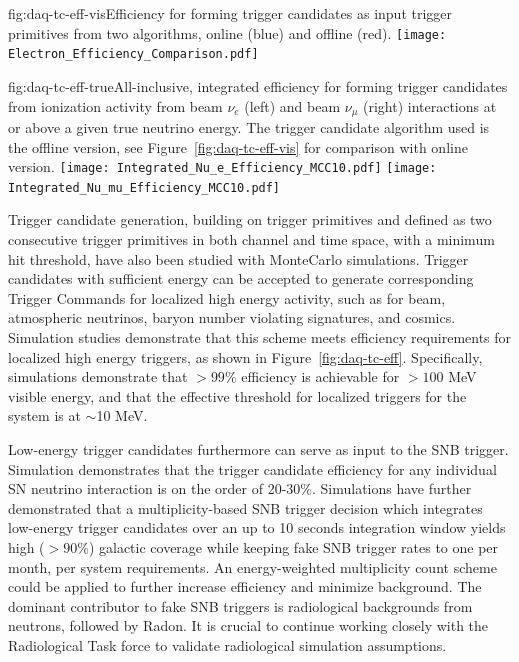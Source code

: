 \begin{dunefigure}{fig:daq-tc-eff-vis}{Efficiency for forming trigger candidates as input trigger primitives from two algorithms, online (blue) and offline (red).}
  \texttt{[image: Electron\_Efficiency\_Comparison.pdf]}
\end{dunefigure}

\begin{dunefigure}{fig:daq-tc-eff-true}{All-inclusive, integrated efficiency for forming trigger candidates from ionization activity from beam $\nu_e$ (left) and beam $\nu_\mu$ (right) interactions at or above a given true neutrino energy.  The trigger candidate algorithm used is the offline version, see Figure~\ref{fig:daq-tc-eff-vis} for comparison with online version.}
  \texttt{[image: Integrated\_Nu\_e\_Efficiency\_MCC10.pdf]}%
  \texttt{[image: Integrated\_Nu\_mu\_Efficiency\_MCC10.pdf]}
\end{dunefigure}


Trigger candidate generation, building on trigger primitives and defined
as two consecutive trigger primitives in both channel and time space,
with a minimum hit threshold, have also been studied with MonteCarlo
simulations. Trigger candidates with sufficient energy can be accepted
to generate corresponding Trigger Commands for localized high energy
activity, such as for beam, atmospheric neutrinos, baryon number
violating signatures, and cosmics. Simulation studies demonstrate that
this scheme meets efficiency requirements for localized high energy
triggers, as shown in Figure~\ref{fig:daq-tc-eff}. Specifically,
simulations demonstrate that $>99$\% efficiency is achievable for
$>100$ MeV visible energy, and that the effective threshold for
localized triggers for the system is at $\sim$10 MeV. 

Low-energy trigger candidates furthermore can serve as input to the
SNB trigger. Simulation demonstrates that the trigger candidate
efficiency for any individual SN neutrino interaction is on the order
of 20-30\%. Simulations have further demonstrated that a
multiplicity-based SNB trigger decision which integrates low-energy
trigger candidates over an up to 10 seconds
integration window yields high ($>90$\%) galactic coverage while
keeping fake SNB trigger rates to one per month, per system
requirements. An energy-weighted multiplicity count scheme could be
applied to further increase efficiency and minimize background.
The dominant contributor to fake SNB triggers is
radiological backgrounds from neutrons, followed by Radon. It is
crucial to continue working closely with the Radiological Task force
to validate radiological simulation assumptions.

